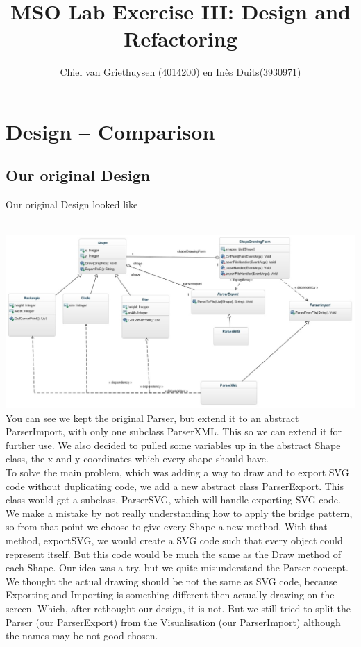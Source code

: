 \documentclass[a4paper,12pt]{article}
\begin{document}
\begin{titlepage}

\title{MSO Lab Exercise III: Design and Refactoring}
\author{Chiel van Griethuysen (4014200) en In\`es Duits(3930971)}
\maketitle

\end{titlepage}

\newpage

\tableofcontents

\newpage

\section{Design – Comparison}

\subsection{Our original Design}
Our original Design looked like

\\
\includegraphics[scale=0.5]{diagram.jpg}
\\

You can see we kept the original Parser, but extend it to an abstract ParserImport, with only one subclass ParserXML. This so we can extend it for further use. We also decided to pulled some variables up in the abstract Shape class, the x and y coordinates which every shape should have.
\\
To solve the main problem, which was adding a way to draw and to export SVG code without duplicating code, we add a new abstract class ParserExport. This class would get a subclass, ParserSVG, which will handle exporting SVG code. We make a mistake by not really understanding how to apply the bridge pattern, so from that point we choose to give every Shape a new method. With that method, exportSVG, we would create a SVG code such that every object could represent itself. But this code would be much the same as the Draw method of each Shape. Our idea was a try, but we quite misunderstand the Parser concept. We thought the actual drawing should be not the same as SVG code, because Exporting and Importing is something different then actually drawing on the screen. Which, after rethought our design, it is not. But we still tried to split the Parser (our ParserExport) from the Visualisation (our ParserImport) although the names may be not good chosen. 
\\
\end{document}
